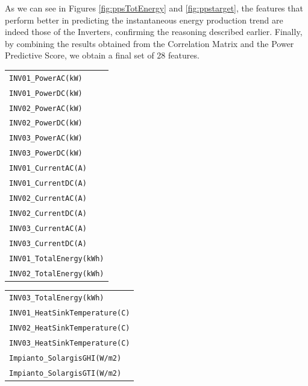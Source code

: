 As we can see in Figures \ref{fig:ppsTotEnergy} and \ref{fig:ppstarget}, the features
that perform better in predicting the instantaneous energy production trend are
indeed those of the Inverters, confirming the reasoning described earlier.
Finally, by combining the results obtained from the Correlation Matrix and the
Power Predictive Score, we obtain a final set of 28 features.

%
\begin{table}[H]
	\begin{center}
		\begin{tabular}[c]{l|}
			\verb|INV01_PowerAC(kW)|      \\
			\verb|INV01_PowerDC(kW)|      \\
			\verb|INV02_PowerAC(kW)|      \\
			\verb|INV02_PowerDC(kW)|      \\
			\verb|INV03_PowerAC(kW)|      \\
			\verb|INV03_PowerDC(kW)|      \\
			\verb|INV01_CurrentAC(A)|     \\
			\verb|INV01_CurrentDC(A)|     \\
			\verb|INV02_CurrentAC(A)|     \\
			\verb|INV02_CurrentDC(A)|     \\
			\verb|INV03_CurrentAC(A)|     \\
			\verb|INV03_CurrentDC(A)|     \\
			\verb|INV01_TotalEnergy(kWh)| \\
			\verb|INV02_TotalEnergy(kWh)|
		\end{tabular}
		\begin{tabular}[c]{l}
			\verb|INV03_TotalEnergy(kWh)|       \\
			\verb|INV01_HeatSinkTemperature(C)| \\
			\verb|INV02_HeatSinkTemperature(C)| \\
			\verb|INV03_HeatSinkTemperature(C)| \\
			\verb|Impianto_SolargisGHI(W/m2)|   \\
			\verb|Impianto_SolargisGTI(W/m2)|   \\

\end{tabular}
\end{center}
\end{table}
